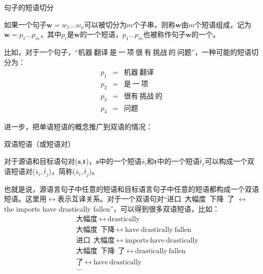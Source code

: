 \vspace{0.5em}
\begin{definition} 句子的短语切分

{\small
如果一个句子$\mathbf{w} = w_1...w_n$可以被切分为$m$个子串，则称$\mathbf{w}$由$m$个短语组成，记为$\mathbf{w} = p_1...p_m$，其中$p_i$是$\mathbf{w}$的一个短语，$p_1...p_m$也被称作句子$\mathbf{w}$的一个{\small{}}。
}
\end{definition}

\parinterval 比如，对于一个句子，``$\text{机器}\ \text{翻译}\ \text{是}\ \text{一}\ \text{项}\ \text{很}\ \text{有}\ \text{挑战}\ \text{的}\ \text{问题}$''，一种可能的短语切分为：
\begin{eqnarray}
p_1 &=& \text{机器}\ \text{翻译} \nonumber \\
p_2 &=& \text{是}\ \text{一}\ \text{项} \nonumber \\
p_3 &=& \text{很有}\ \text{挑战}\ \text{的} \nonumber \\
p_4 &=& \text{问题}\nonumber
\end{eqnarray}

\parinterval 进一步，把单语短语的概念推广到双语的情况：

\vspace{0.5em}
\begin{definition} 双语短语（或短语对）

{\small
对于源语和目标语句对($\mathbf{s}$,$\mathbf{t}$)，$\mathbf{s}$中的一个短语$\bar{s}_i$和$\mathbf{t}$中的一个短语$\bar{t}_j$可以构成一个双语短语对($\bar{s}_i,\bar{t}_j$)，简称{\small{}}($\bar{s}_i,\bar{t}_j$)。
}
\end{definition}

\parinterval 也就是说，源语言句子中任意的短语和目标语言句子中任意的短语都构成一个双语短语。这里用$\leftrightarrow$表示互译关系。对于一个双语句对``进口\ 大幅度\ 下降\ 了 $\leftrightarrow$ the imports have drastically fallen''，可以得到很多双语短语，比如：
\begin{eqnarray}
&&\text{大幅度}\ \leftrightarrow\ \textrm{drastically} \nonumber \\
&&\text{大幅度}\ \ \text{下降}\ \leftrightarrow\ \textrm{have}\ \textrm{drastically}\ \textrm{fallen} \nonumber \\
&&\text{进口}\ \ \text{大幅度}\ \leftrightarrow\ \textrm{imports}\ \textrm{have}\ \textrm{drastically} \nonumber \\
&&\text{大幅度}\ \ \text{下降}\ \ \text{了}\ \leftrightarrow\ \textrm{drastically}\ \textrm{fallen} \nonumber \\
&&\text{了}\ \leftrightarrow\ \textrm{have}\ \textrm{drastically} \nonumber \\
&&... \nonumber
\end{eqnarray}

